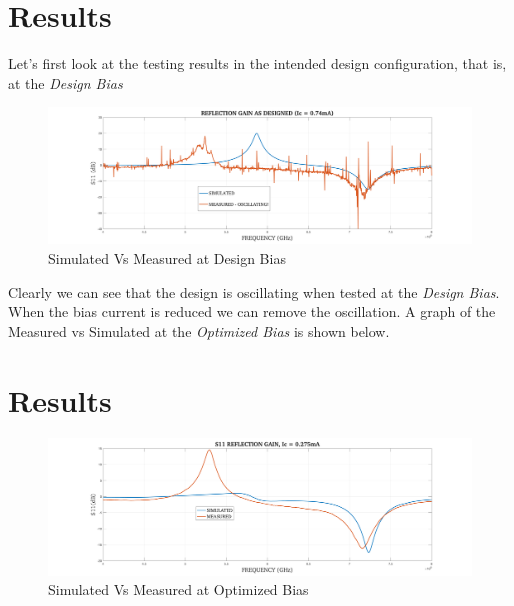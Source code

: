 \documentclass{article}                                                         %
\begin{document}

\clearpage

\section{Results}
Let's first look at the testing results in the intended design configuration, that is, at the \textit{Design Bias}
\begin{figure}[H]
  \centering
  \includegraphics[width=1\textwidth] {Figures/S11_originalDesign.png}
  \caption{Simulated Vs Measured at Design Bias}
    \label{fig:f1}
\end{figure}

Clearly we can see that the design is oscillating when tested at the \textit{Design Bias}. When the bias current is
reduced we can remove the oscillation. A graph of the Measured vs Simulated at the \textit{Optimized Bias} is shown below.

\section{Results}
\begin{figure}[H]
  \centering
  \includegraphics[width=1\textwidth] {Figures/S11_optimizedTest.png}
  \caption{Simulated Vs Measured at Optimized Bias}
    \label{fig:f2}
\end{figure}
\end{document}
